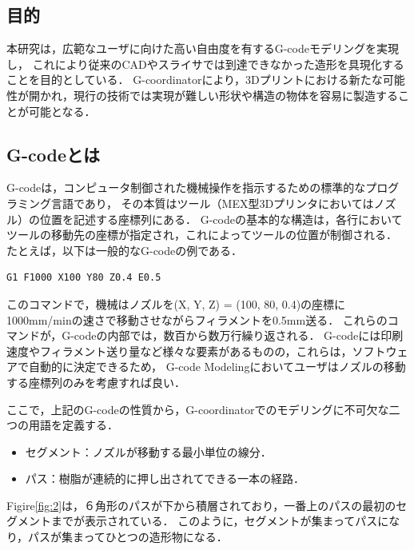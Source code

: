 \documentclass{article}
\begin{document}
\begin{twocolumn}
\subsection{目的}
本研究は，広範なユーザに向けた高い自由度を有するG-codeモデリングを実現し，
これにより従来のCADやスライサでは到達できなかった造形を具現化することを目的としている．
G-coordinatorにより，3Dプリントにおける新たな可能性が開かれ，現行の技術では実現が難しい形状や構造の物体を容易に製造することが可能となる．

\subsection{G-codeとは}
G-codeは，コンピュータ制御された機械操作を指示するための標準的なプログラミング言語であり，
その本質はツール（MEX型3Dプリンタにおいてはノズル）の位置を記述する座標列にある．
G-codeの基本的な構造は，各行においてツールの移動先の座標が指定され，これによってツールの位置が制御される．
たとえば，以下は一般的なG-codeの例である．
\begin{verbatim}
G1 F1000 X100 Y80 Z0.4 E0.5 
\end{verbatim}
このコマンドで，機械はノズルを(X, Y, Z) = (100, 80, 0.4)の座標に1000mm/minの速さで移動させながらフィラメントを0.5mm送る．
これらのコマンドが，G-codeの内部では，数百から数万行繰り返される．
G-codeには印刷速度やフィラメント送り量など様々な要素があるものの，これらは，ソフトウェアで自動的に決定できるため，
G-code Modelingにおいてユーザはノズルの移動する座標列のみを考慮すれば良い． 

ここで，上記のG-codeの性質から，G-coordinatorでのモデリングに不可欠な二つの用語を定義する．
\begin{itemize}
  \item セグメント：ノズルが移動する最小単位の線分．
  \item パス：樹脂が連続的に押し出されてできる一本の経路．
\end{itemize}

Figire\ref{fig:2}は，６角形のパスが下から積層されており，一番上のパスの最初のセグメントまでが表示されている．
このように，セグメントが集まってパスになり，パスが集まってひとつの造形物になる．



\end{twocolumn}
\end{document}
